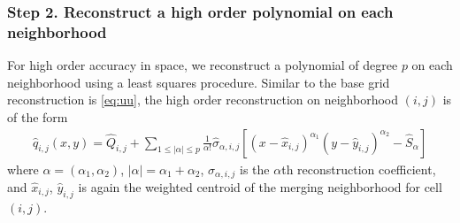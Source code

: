 \subsubsection*{Step 2. Reconstruct a high order polynomial on each neighborhood}
For high order accuracy in space, we reconstruct a polynomial of degree $p$ on each neighborhood using a least squares procedure.  Similar to the base grid reconstruction is \eqref{eq:uu}, the high order reconstruction on neighborhood $(i,j)$ is of the form
\begin{equation}\label{eq:q}
\begin{aligned}
    \widehat q_{i,j} (x,y) = \widehat{Q}_{i,j} +  \sum_{1 \leq |\alpha| \leq p}  \frac{1}{\alpha!} \widehat \sigma_{\alpha,i,j} [(x-\widehat x_{i,j})^{\alpha_1}(y-\widehat y_{i,j})^{\alpha_2}-\widehat S_{\alpha}]
\end{aligned}
\end{equation}
where $\alpha = (\alpha_1, \alpha_2)$, $|\alpha| = \alpha_1 + \alpha_2$, $\sigma_{\alpha,i,j}$ is the $\alpha$th reconstruction coefficient,
and $\widehat x_{i,j}$, $\widehat y_{i,j}$ is again the weighted centroid of the merging neighborhood for cell $(i,j)$. 
